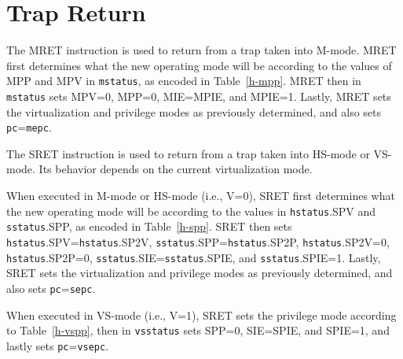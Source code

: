 \section{Trap Return}

The MRET instruction is used to return from a trap taken into M-mode.
MRET first determines what the new operating mode will be according to
the values of MPP and MPV in {\tt mstatus}, as encoded in
Table~\ref{h-mpp}.
MRET then in {\tt mstatus} sets MPV=0, MPP=0, MIE=MPIE, and MPIE=1.
Lastly, MRET sets the virtualization and privilege modes as previously
determined, and also sets {\tt pc}={\tt mepc}.

The SRET instruction is used to return from a trap taken into HS-mode or
VS-mode.  Its behavior depends on the current virtualization mode.

When executed in M-mode or HS-mode (i.e., V=0), SRET first determines
what the new operating mode will be according to the values in
{\tt hstatus}.SPV and {\tt sstatus}.SPP, as encoded in Table~\ref{h-spp}.
SRET then sets {\tt hstatus}.SPV={\tt hstatus}.SP2V,
{\tt sstatus}.SPP={\tt hstatus}.SP2P, {\tt hstatus}.SP2V=0,
{\tt hstatus}.SP2P=0, {\tt sstatus}.SIE={\tt sstatus}.SPIE, and
{\tt sstatus}.SPIE=1.
Lastly, SRET sets the virtualization and privilege modes as previously
determined, and also sets {\tt pc}={\tt sepc}.

When executed in VS-mode (i.e., V=1), SRET sets the privilege mode according to
Table~\ref{h-vspp}, then in {\tt vsstatus} sets SPP=0, SIE=SPIE, and SPIE=1, and
lastly sets {\tt pc}={\tt vsepc}.
